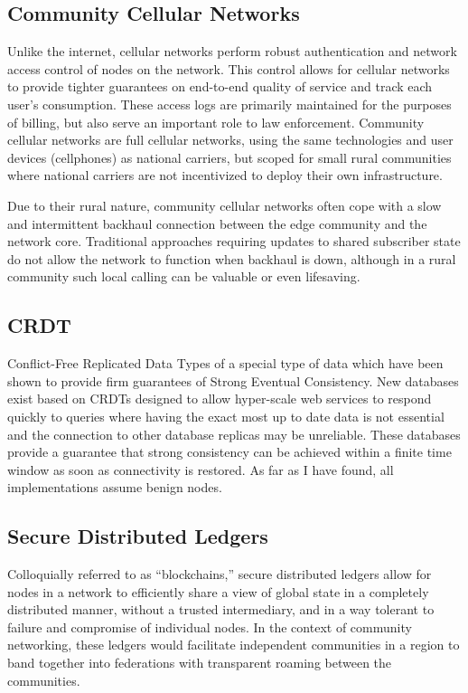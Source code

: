 \documentclass[sigconf]{acmart}
\begin{document}
\subsection{Community Cellular Networks}
Unlike the internet, cellular networks perform robust authentication
and network access control of nodes on the network. This control
allows for cellular networks to provide tighter guarantees on
end-to-end quality of service and track each user's consumption. These
access logs are primarily maintained for the purposes of billing, but
also serve an important role to law enforcement. Community cellular
networks are full cellular networks, using the same technologies and
user devices (cellphones) as national carriers, but scoped for small
rural communities where national carriers are not incentivized to
deploy their own infrastructure.\cite{Heimerllongitudinalstudylocal2015}

Due to their rural nature, community cellular networks often cope with
a slow and intermittent backhaul connection between the edge community
and the network core. Traditional approaches requiring updates to
shared subscriber state do not allow the network to function when
backhaul is down, although in a rural community such local calling
can be valuable or even lifesaving.

\subsection{CRDT}
Conflict-Free Replicated Data Types of a special type of data which
have been shown to provide firm guarantees of Strong Eventual
Consistency.\cite{ShapiroConflictfreereplicateddata2011} New databases exist based on CRDTs designed to
allow hyper-scale web services to respond quickly to queries where
having the exact most up to date data is not essential and the
connection to other database replicas may be unreliable.\cite{DatanetNewCRDT16} These
databases provide a guarantee that strong consistency can be achieved
within a finite time window as soon as connectivity is restored. As
far as I have found, all implementations assume benign nodes.

\subsection{Secure Distributed Ledgers}
Colloquially referred to as ``blockchains,'' secure distributed
ledgers allow for nodes in a network to efficiently share a view of
global state in a completely distributed manner, without a trusted
intermediary, and in a way tolerant to failure and compromise of
individual nodes.\cite{BabuBlockchainTelco2016} In the context of community networking, these
ledgers would facilitate independent communities in a region to band
together into federations with transparent roaming between the
communities.
\end{document}
